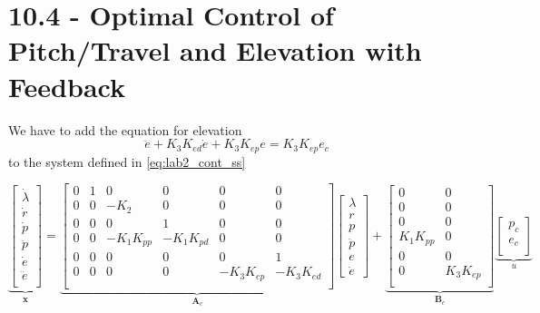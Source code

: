\documentclass[../main.tex]{subfiles}
\begin{document}
\section{10.4 - Optimal Control of Pitch/Travel and Elevation with Feedback}
We have to add the equation for elevation 
$$ \ddot{e} + K_3K_{ed}\dot{e} + K_3K_{ep}e = K_3K_{ep}e_c $$
to the system defined in \cref{eq:lab2_cont_ss}

\begin{equation}\label{eq:lab4_cont_ss}
	\underbrace{\begin{bmatrix}
		\dot \lambda \\
		\dot r \\
		\dot p \\
		\ddot p \\
        \dot e \\
        \ddot e \\
	\end{bmatrix}}_{\bm{\dot x}} = 
	\underbrace{
	\begin{bmatrix}
		0 & 1 & 0 & 0 & 0 & 0\\
		0 & 0 & -K_2 & 0 & 0 & 0\\
		0 & 0 & 0 & 1 & 0 & 0\\
		0 & 0 & -K_1 K_{pp} &  -K_1 K_{pd} & 0 & 0\\
        0 & 0 & 0 & 0 & 0 & 1 \\
        0 & 0 & 0 & 0 & -K_3K_{ep} & -K_3K_{ed} \\
	\end{bmatrix}
	}_{\bm A_c}
	\begin{bmatrix}
		\lambda \\ r \\ p \\ \dot{p} \\ e \\ \dot{e}
	\end{bmatrix}
	+
	\underbrace{
		\begin{bmatrix}
			0 & 0 \\
            0 & 0\\
            0 & 0\\
            K_1 K_{pp} & 0\\
            0 & 0 \\
            0 & K_3K_{ep} \\
		\end{bmatrix}
	}_{\bm B_c} 
    \underbrace{
        \begin{bmatrix}
            p_c \\
            e_c \\
        \end{bmatrix}
    }_{u}
\end{equation}
\end{document}

